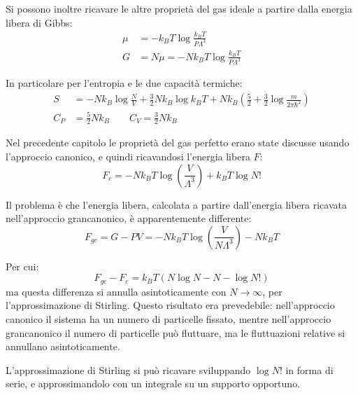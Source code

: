 Si possono inoltre ricavare le altre proprietà del gas ideale a partire dalla energia libera di Gibbs:
\begin{align*}
	\mu &= - k_B T \log \frac{k_B T}{P \Lambda^3}\\
	G &= N\mu = - N k_B T \log \frac{k_B T}{P \Lambda^3}
\end{align*}

In particolare per l'entropia e le due capacità termiche:
\begin{align*}
	S &= -Nk_B \log \frac{N}{V} + \frac{3}{2} N k_B \log k_B T + N k_B \left(\frac{5}{2} + \frac{3}{2}\log \frac{m}{2\pi \hbar^2}\right)\\
	C_P &= \frac{5}{2} N k_B \qquad C_V = \frac{3}{2} N k_B
\end{align*}

Nel precedente capitolo le proprietà del gas perfetto erano state discusse usando l'approccio canonico, e quindi ricavandosi l'energia libera $F$:
\begin{equation*}
	F_c = - N k_B T \log \left(\frac{V}{\Lambda^3}\right) + k_B T \log N!
\end{equation*}

Il problema è che l'energia libera, calcolata a partire dall'energia libera ricavata nell'approccio grancanonico, è apparentemente differente:
\begin{equation*}
F_{gc} = G - PV = - N k_B T \log \left(\frac{V}{N \Lambda^3}\right) - N k_B T
\end{equation*}

\noindent Per cui:
\begin{equation*}
	F_{gc} - F_c = k_B T (N \log N - N - \log N!)
\end{equation*}
ma questa differenza si annulla asintoticamente con $N \rightarrow \infty$, per l'approssimazione di Stirling. 
Questo risultato era prevedebile: nell'approccio canonico il sistema ha un numero di particelle fissato, mentre nell'approccio grancanonico il numero di particelle può fluttuare, ma le fluttuazioni relative si annullano asintoticamente.

\begin{ex}
	L'approssimazione di Stirling si può ricavare sviluppando $\log N!$ in forma di serie, e approssimandolo con un integrale su un supporto opportuno.
\end{ex}

